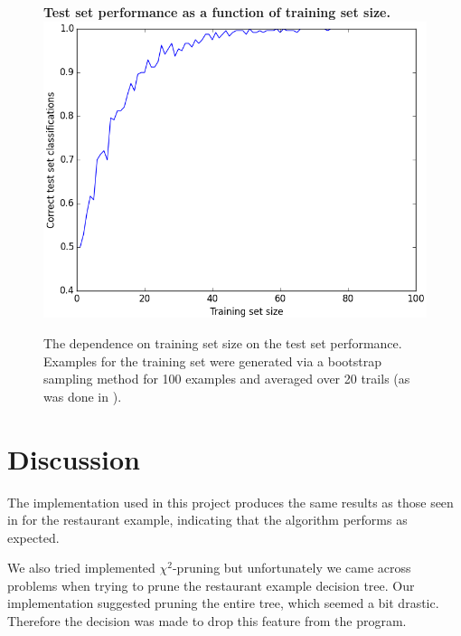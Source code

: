 \documentclass{article}
\begin{document}
\begin{figure}[h!]
    \centering
    \textbf{Test set performance as a function of training set size.}
    \includegraphics[scale=0.5]{restaurant_learning_curve.png}
    \caption{The dependence on training set size on the test set performance. Examples for the training set were generated via a bootstrap sampling method for 100 examples and averaged over 20 trails (as was done in \cite{Russell}).}
    \label{fig:learning-curve}
\end{figure}


\section{Discussion}

The implementation used in this project produces the same results as those seen in \cite{Russell} for the restaurant example, indicating that the algorithm performs as expected.

We also tried implemented $\chi^2$-pruning but unfortunately we came across problems when trying to prune the restaurant example decision tree. Our implementation suggested pruning the entire tree, which seemed a bit drastic. Therefore the decision was made to drop this feature from the program.


\printbibliography
\end{document}
